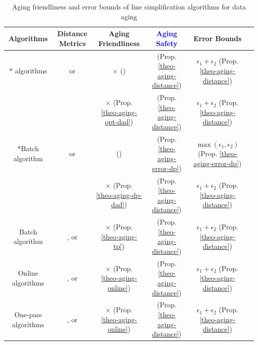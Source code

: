 \begin{table}
	\renewcommand{\arraystretch}{1.20}
	\vspace{-1ex}
	\caption{\small Aging friendliness and error bounds of line simplification algorithms for data aging}
	\label{tab:summary-data-aging}
	\centering
	\scriptsize
	\begin{tabular}{|c|c|c|c|c|c|}
		\hline
		{\bf{Algorithms}} &\bf{Distance Metrics} & \bf{Aging Friendliness} & \bf{\textcolor{blue}{Aging Safety}} & {\bf{Error Bounds}}  \\		
		\hline

		{\multirow{2}*{{\opt} algorithms}} &\ped or \sed	& \hspace{2ex} $\times$ (\cite{Cao:Spatio}) & \checkmark (Prop. \ref{theo-aging-distance}) & $\epsilon_1 + \epsilon_2$  (Prop. \ref{theo-aging-distance})	\\
		\cline{2-5}
		
		&\dad	& $\times$  (Prop. \ref{theo-aging-opt-dad})	& \checkmark (Prop. \ref{theo-aging-distance}) &$\epsilon_1 + \epsilon_2$  (Prop. \ref{theo-aging-distance})\\
		\hline
		
		{\multirow{2}*{Batch algorithm \dpa}} &\ped or \sed	&\checkmark (\cite{Cao:Spatio}) &\checkmark (Prop. \ref{theo-aging-error-dp}) & $\max(\epsilon_1, \epsilon_2)$   (Prop. \ref{theo-aging-error-dp})\\
		\cline{2-5}
		
		&\dad	& $\times$  (Prop. \ref{theo-aging-dp-dad}) & \checkmark (Prop. \ref{theo-aging-distance}) & $\epsilon_1 + \epsilon_2$   (Prop. \ref{theo-aging-distance})\\
		\hline
		
		{Batch algorithm \tpa}	& \ped, \sed or \dad & $\times$  (Prop. \ref{theo-aging-tp}) & \checkmark (Prop. \ref{theo-aging-distance}) &$\epsilon_1 + \epsilon_2$  (Prop. \ref{theo-aging-distance})  \\
		\hline
		
		{Online algorithms}	& \ped, \sed or \dad & $\times$  (Prop. \ref{theo-aging-online})& \checkmark (Prop. \ref{theo-aging-distance}) &$\epsilon_1 + \epsilon_2$  (Prop. \ref{theo-aging-distance})  \\
		\hline

		{One-pass algorithms}	& \ped, \sed or \dad & $\times$ (Prop. \ref{theo-aging-online})&\checkmark (Prop. \ref{theo-aging-distance}) &$\epsilon_1 + \epsilon_2$  (Prop. \ref{theo-aging-distance})  \\

		\hline
	\end{tabular}
	\vspace{-2ex}
\end{table}




